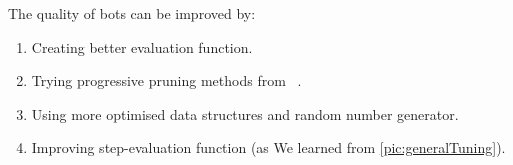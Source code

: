 \noindent The quality of bots can be improved by:
\begin{enumerate}
\item Creating better evaluation function.
\item Trying progressive pruning methods from ~\cite{progressive-strategies,
MonteCarloGo}.
\item Using more optimised data structures and random number generator.
\item Improving step-evaluation function (as We learned from \ref{pic:generalTuning}).
\end{enumerate}
